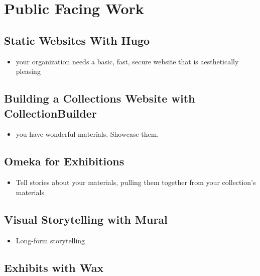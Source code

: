 \documentclass[
]{book}
\providecommand{\tightlist}{%
  \setlength{\itemsep}{0pt}\setlength{\parskip}{0pt}}
\begin{document}
\hypertarget{public-facing-work}{%
\chapter{Public Facing Work}\label{public-facing-work}}

\hypertarget{hugo}{%
\section{Static Websites With Hugo}\label{hugo}}

\begin{itemize}
\tightlist
\item
  your organization needs a basic, fast, secure website that is aesthetically pleasing
\end{itemize}

\hypertarget{collectionbuilder}{%
\section{Building a Collections Website with CollectionBuilder}\label{collectionbuilder}}

\begin{itemize}
\tightlist
\item
  you have wonderful materials. Showcase them.
\end{itemize}

\hypertarget{omeka}{%
\section{Omeka for Exhibitions}\label{omeka}}

\begin{itemize}
\tightlist
\item
  Tell stories about your materials, pulling them together from your collection's materials
\end{itemize}

\hypertarget{mural}{%
\section{Visual Storytelling with Mural}\label{mural}}

\begin{itemize}
\tightlist
\item
  Long-form storytelling
\end{itemize}

\hypertarget{wax}{%
\section{Exhibits with Wax}\label{wax}}
\end{document}
